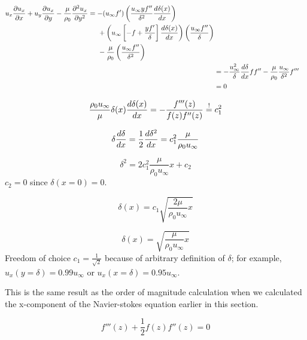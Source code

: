 \begin{align}
\begin{split}
u_x\frac{\partial u_x}{\partial x} + u_y\frac{\partial u_x}{\partial y} - \frac{\mu}{\rho_0}\frac{\partial^2 u_x}{\partial y^2} &=
-(u_\infty f') \left(\frac{u_\infty y f''}{\delta^2} \frac{d \delta(x)}{d x}\right) \\
&\hspace{5mm} + \left(u_\infty\left[-f+\frac{yf'}{\delta}\right]\frac{d \delta(x)}{d x}\right) \left(\frac{u_\infty f''}{\delta}\right) \\
&\hspace{5mm} -\frac{\mu}{\rho_0} \left(\frac{u_\infty f''}{\delta^2}\right)
\end{split} \\
&= -\frac{u_\infty^2}{\delta}\frac{d \delta}{d x} ff'' - \frac{\mu}{\rho_0} \frac{u_\infty}{\delta^2}f'''\\
&= 0
\end{align}

\begin{equation}
\frac{\rho_0 u_\infty}{\mu} \delta(x) \frac{d \delta(x)}{d x} = -\frac{f'''(z)}{f(z)f''(z)} \overset{!}{=} c_1^2
\end{equation}

\begin{equation}
\delta\frac{d \delta}{d x} = \frac{1}{2}\frac{d \delta^2}{d x} = c_1^2\frac{\mu}{\rho_0u_\infty}\\
\end{equation}

\begin{equation}
\delta^2 = 2c_1^2 \frac{\mu}{\rho_0u_\infty}x + c_2
\end{equation}
$c_2=0$ since $\delta(x=0)=0$.

\begin{equation}
\delta(x) = c_1\sqrt{\frac{2\mu}{\rho_0u_\infty}x}
\end{equation}

\begin{equation}
\delta(x)=\sqrt{\frac{\mu}{\rho_0u_\infty}x}
\end{equation}
Freedom of choice $c_1=\frac{1}{\sqrt{2}}$ because of arbitrary definition of $\delta$; for example, $u_x(y=\delta)=0.99u_\infty$ or $u_x(x=\delta)=0.95u_\infty$.

This is the same result as the order of magnitude calculation when we calculated the x-component of the Navier-stokes equation earlier in this section.

\begin{equation}
f'''(z) +\frac{1}{2} f(z)f''(z) = 0
\end{equation}

